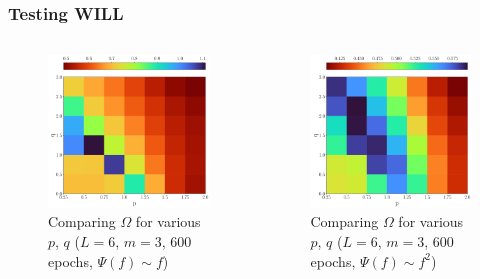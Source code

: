 \documentclass{beamer}
\begin{document}
\begin{frame}
\frametitle{Testing WILL}
\begin{columns}
\begin{column}{0.5\textwidth}
\begin{figure}
\centering 
\includegraphics[width=\textwidth]{im/omega_3_6_600_linear}
\caption{Comparing $\Omega$ for various $p$, $q$ ($L=6$, $m=3$, 600 epochs, $\Psi(f)\sim f$)}
\end{figure}
\end{column}
\begin{column}{0.5\textwidth}
\begin{figure}
\centering 
\includegraphics[width=\textwidth]{im/omega_3_6_600_quadratic}
\caption{Comparing $\Omega$ for various $p$, $q$ ($L=6$, $m=3$, 600 epochs, $\Psi(f)\sim f^2$)}
\end{figure}
\end{column}
\end{columns}
\end{frame}
\end{document}
